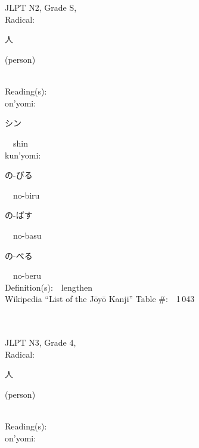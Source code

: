 \begin{multicols}{2}
\ \ \\
{\fontsize{34pt}{40pt}  }\ \ \\  %
{JLPT N2, Grade S, \\Radical:\ \ {\begin{CJK}{UTF8}{min} 人 \end{CJK}} (person) } \\
Reading(s):\ \ \\
{\hspace*{1em}}on'yomi:\ \ \\
{\hspace*{2em}}{\begin{CJK}{UTF8}{min} シン \end{CJK}}\ \ shin\ \ \\
{\hspace*{1em}}kun'yomi:\ \ \\
{\hspace*{2em}}{\begin{CJK}{UTF8}{min} の-びる \end{CJK}}\ \ no-biru\ \ \\
{\hspace*{2em}}{\begin{CJK}{UTF8}{min} の-ばす \end{CJK}}\ \ no-basu\ \ \\
{\hspace*{2em}}{\begin{CJK}{UTF8}{min} の-べる \end{CJK}}\ \ no-beru\ \ \\
Definition(s):\ \ lengthen \\
Wikipedia ``List of the J\=oy\=o Kanji'' Table \#:\ \ 1\,043 \\
\ \ \\
{\fontsize{34pt}{40pt}  }\ \ \\  %
{JLPT N3, Grade 4, \\Radical:\ \ {\begin{CJK}{UTF8}{min} 人 \end{CJK}} (person) } \\
Reading(s):\ \ \\
{\hspace*{1em}}on'yomi:\ \ \\

\end{multicols}
